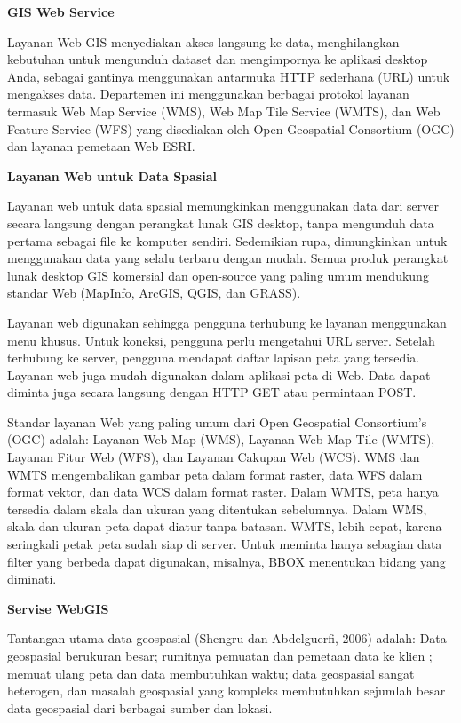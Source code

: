 \documentclass[]{book}
\begin{document}
\textbf{GIS Web Service}

Layanan Web GIS menyediakan akses langsung ke data, menghilangkan kebutuhan untuk mengunduh dataset dan mengimpornya ke aplikasi desktop Anda, sebagai gantinya menggunakan antarmuka HTTP sederhana (URL) untuk mengakses data. Departemen ini menggunakan berbagai protokol layanan termasuk Web Map Service (WMS), Web Map Tile Service (WMTS), dan Web Feature Service (WFS) yang disediakan oleh Open Geospatial Consortium (OGC) dan layanan pemetaan Web ESRI.

\textbf{Layanan Web untuk Data Spasial}

Layanan web untuk data spasial memungkinkan menggunakan data dari server secara langsung dengan perangkat lunak GIS desktop, tanpa mengunduh data pertama sebagai file ke komputer sendiri. Sedemikian rupa, dimungkinkan untuk menggunakan data yang selalu terbaru dengan mudah. Semua produk perangkat lunak desktop GIS komersial dan open-source yang paling umum mendukung standar Web (MapInfo, ArcGIS, QGIS, dan GRASS).

Layanan web digunakan sehingga pengguna terhubung ke layanan menggunakan menu khusus. Untuk koneksi, pengguna perlu mengetahui URL server. Setelah terhubung ke server, pengguna mendapat daftar lapisan peta yang tersedia. Layanan web juga mudah digunakan dalam aplikasi peta di Web. Data dapat diminta juga secara langsung dengan HTTP GET atau permintaan POST.

Standar layanan Web yang paling umum dari Open Geospatial Consortium's (OGC) adalah: Layanan Web Map (WMS), Layanan Web Map Tile (WMTS), Layanan Fitur Web (WFS), dan Layanan Cakupan Web (WCS). WMS dan WMTS mengembalikan gambar peta dalam format raster, data WFS dalam format vektor, dan data WCS dalam format raster. Dalam WMTS, peta hanya tersedia dalam skala dan ukuran yang ditentukan sebelumnya. Dalam WMS, skala dan ukuran peta dapat diatur tanpa batasan. WMTS, lebih cepat, karena seringkali petak peta sudah siap di server. Untuk meminta hanya sebagian data filter yang berbeda dapat digunakan, misalnya, BBOX menentukan bidang yang diminati.

\textbf{Servise WebGIS}

Tantangan utama data geospasial (Shengru dan Abdelguerfi, 2006) adalah: Data geospasial berukuran besar; rumitnya pemuatan dan pemetaan data ke klien ; memuat ulang peta dan data membutuhkan waktu; data geospasial sangat heterogen, dan masalah geospasial yang kompleks membutuhkan sejumlah besar data geospasial dari berbagai sumber dan lokasi.
\end{document}
